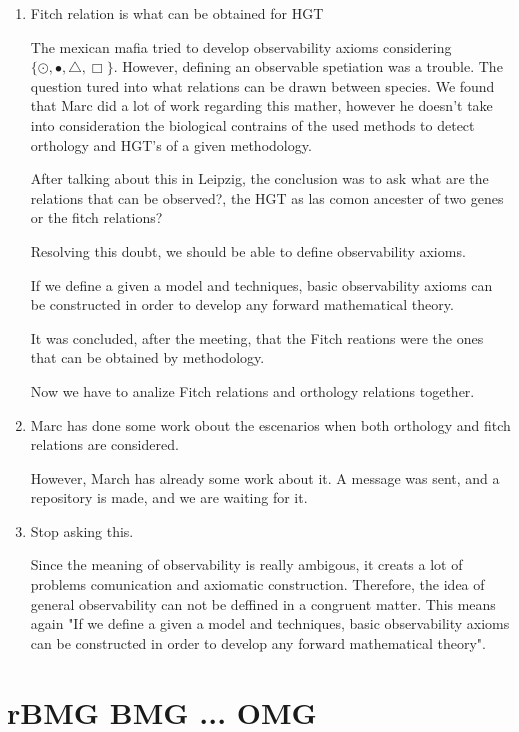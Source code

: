 \documentclass[11pt]{article}
\begin{document}
\begin{enumerate}

\item Fitch relation is what can be obtained for HGT

The mexican mafia tried to develop observability axioms considering $ \{ \odot , \bullet , \triangle , \Box \} $. However, defining an observable spetiation was a trouble.
The question tured into what relations can be drawn between species. We found that Marc did a lot of work regarding this mather, however he doesn't take into consideration the biological contrains of the used methods to detect orthology and HGT's of a given methodology.

After talking about this in Leipzig, the conclusion was to ask what are the relations that can be observed?, the HGT as las comon ancester of two genes or the fitch relations?

Resolving this doubt, we should be able to define observability axioms.

If we define a given a model and techniques, basic observability axioms can be constructed in order to develop any forward mathematical theory.

It was concluded, after the meeting, that the Fitch reations were the ones that can be obtained by methodology.

Now we have to analize Fitch relations and orthology relations together.

\item Marc has done some work obout the escenarios when both orthology and fitch relations are considered.

However, March has already some work about it. A message was sent, and a repository is made, and we are waiting for it.

\item Stop asking this.

Since the meaning of observability is really ambigous, it creats a lot of problems comunication and axiomatic construction. Therefore, the idea of general observability can not be deffined in a congruent matter. This means again "If we define a given a model and techniques, basic observability axioms can be constructed in order to develop any forward mathematical theory".


\end{enumerate}


\section{rBMG BMG ... OMG}
\end{document}

